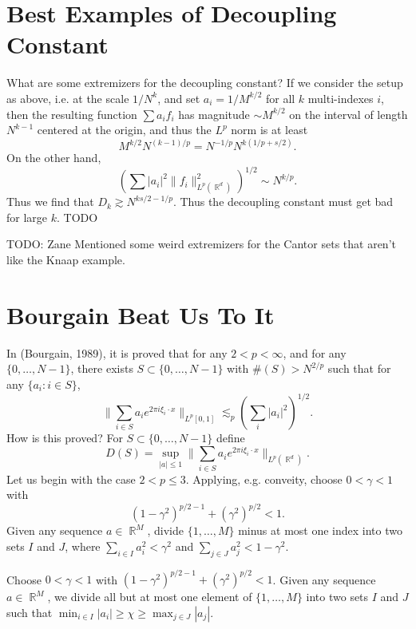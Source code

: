 \documentclass[dvipsnames,letterpaper,12pt]{article}
\numberwithin{equation}{section}
\DeclareMathOperator{\RR}{\mathbb{R}}
\numberwithin{theorem}{section}
\begin{document}
\section{Best Examples of Decoupling Constant}

What are some extremizers for the decoupling constant? If we consider the setup as above, i.e. at the scale $1/N^k$, and set $a_i = 1 / M^{k/2}$ for all $k$ multi-indexes $i$, then the resulting function $\sum a_i f_i$ has magnitude $\sim M^{k/2}$ on the interval of length $N^{k-1}$ centered at the origin, and thus the $L^p$ norm is at least
%
\[ M^{k/2} N^{(k-1)/p} = N^{-1/p} N^{k(1/p + s/2)}. \]
%
On the other hand,
%
\[ \left( \sum |a_i|^2 \| f_i \|_{L^p(\RR^d)}^2 \right)^{1/2} \sim N^{k/p}. \]
%
Thus we find that $D_k \gtrsim N^{ks/2 - 1/p}$. Thus the decoupling constant must get bad for large $k$. TODO

TODO: Zane Mentioned some weird extremizers for the Cantor sets that aren't like the Knaap example.


\section{Bourgain Beat Us To It}

In (Bourgain, 1989), it is proved that for any $2 < p < \infty$, and for any $\{ 0, \dots, N-1 \}$, there exists $S \subset \{ 0, \dots, N-1 \}$ with $\#(S) > N^{2/p}$ such that for any $\{ a_i : i \in S \}$,
%
\[ \| \sum_{i \in S} a_i e^{2 \pi i \xi_i \cdot x} \|_{L^p[0,1]} \lesssim_p \left( \sum_i |a_i|^2 \right)^{1/2}. \]
%
How is this proved? For $S \subset \{ 0, \dots, N-1 \}$ define
%
\[ D(S) = \sup_{|a| \leq 1} \| \sum_{i \in S} a_i e^{2 \pi i \xi_i \cdot x} \|_{L^p(\RR^d)}. \]
%
Let us begin with the case $2 < p \leq 3$. Applying, e.g. conveity, choose $0 < \gamma < 1$ with
%
\[ (1 - \gamma^2)^{p/2 - 1} + (\gamma^2)^{p/2} < 1. \]
%
Given any sequence $a \in \RR^M$, divide $\{ 1, \dots, M \}$ minus at most one index into two sets $I$ and $J$, where $\sum_{i \in I} a_i^2 < \gamma^2$ and $\sum_{j \in J} a_j^2 < 1 - \gamma^2$.

Choose $0 < \gamma < 1$ with $(1 - \gamma^2)^{p/2 - 1} + (\gamma^2)^{p/2} < 1$. Given any sequence $a \in \RR^M$, we divide all but at most one element of $\{ 1, \dots, M \}$ into two sets $I$ and $J$ such that $\min_{i \in I} |a_i| \geq \chi \geq \max_{j \in J} |a_j|$.
\end{document}
